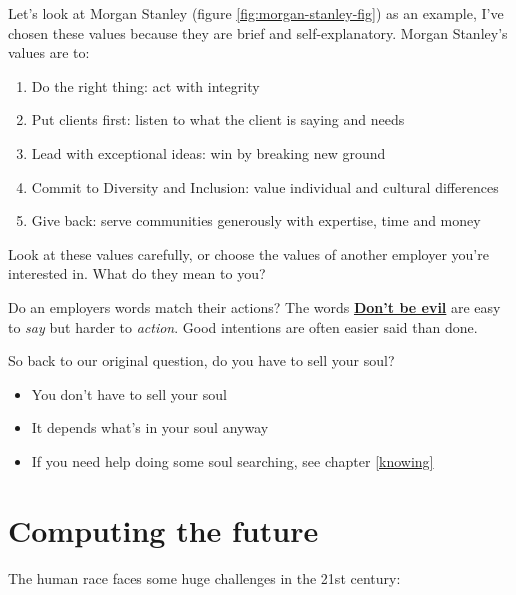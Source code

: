 \documentclass[
]{book}
\providecommand{\tightlist}{%
  \setlength{\itemsep}{0pt}\setlength{\parskip}{0pt}}
\begin{document}
Let's look at Morgan Stanley (figure \ref{fig:morgan-stanley-fig}) as an example, I've chosen these values because they are brief and self-explanatory. Morgan Stanley's values are to:

\begin{enumerate}
\def\labelenumi{\arabic{enumi}.}
\tightlist
\item
  Do the right thing: act with integrity
\item
  Put clients first: listen to what the client is saying and needs
\item
  Lead with exceptional ideas: win by breaking new ground
\item
  Commit to Diversity and Inclusion: value individual and cultural differences
\item
  Give back: serve communities generously with expertise, time and money
\end{enumerate}

Look at these values carefully, or choose the values of another employer you're interested in. What do they mean to you?

Do an employers words match their actions? The words \textbf{\href{https://en.wikipedia.org/wiki/Don\%27t_be_evil}{Don't be evil}} are easy to \emph{say} but harder to \emph{action}. Good intentions are often easier said than done.

So back to our original question, do you have to sell your soul?

\begin{itemize}
\tightlist
\item
  You don't have to sell your soul \citep{iwannabeadored}
\item
  It depends what's in your soul anyway
\item
  If you need help doing some soul searching, see chapter \ref{knowing}
\end{itemize}

\hypertarget{betterplace}{%
\section{Computing the future}\label{betterplace}}

The human race faces some huge challenges in the 21st century:
\end{document}
